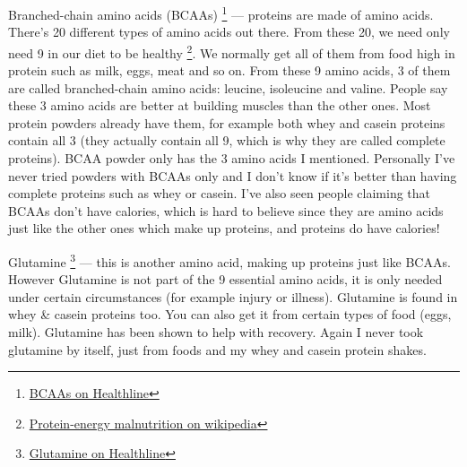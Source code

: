 \documentclass[openany, 12pt]{book}
\begin{document}
        Branched-chain amino acids (BCAAs)
        \footnote{\href{https://www.healthline.com/nutrition/bcaa}{BCAAs on Healthline}} --- proteins are made of amino acids. There's 20 different types of amino
        acids out there. From these 20, we need only need 9 in our diet to be healthy
        \footnote{\href{https://en.wikipedia.org/wiki/Protein\%E2\%80\%93energy\_malnutrition}{Protein-energy malnutrition on wikipedia}}. We normally get all of them from food
        high in protein such as milk, eggs, meat and so on. From these 9 amino acids, 3 of them are called branched-chain amino acids: leucine, isoleucine and valine. People say these 3 amino acids
        are better at building muscles than the other ones. Most protein powders already have them, for example both whey and casein proteins contain all 3 (they actually contain all 9, which is
        why they are called complete proteins). BCAA powder only has the 3 amino acids I mentioned. Personally I've never tried powders with BCAAs only and I don't know if it's better than having
        complete proteins such as whey or casein. I've also seen people claiming that BCAAs don't have calories, which is hard to believe since they are amino acids just like the other ones which
        make up proteins, and proteins do have calories!

        Glutamine
        \footnote{\href{https://www.healthline.com/nutrition/glutamine}{Glutamine on Healthline}} --- this is another amino acid, making up proteins just like BCAAs. However Glutamine is
        not part of the 9 essential amino acids, it is only needed under certain circumstances (for example injury or illness). Glutamine is found in whey \& casein proteins too. You can also get
        it from certain types of food (eggs, milk). Glutamine has been shown to help with recovery. Again I never took glutamine by itself, just from foods and my whey and casein protein shakes.
\end{document}
